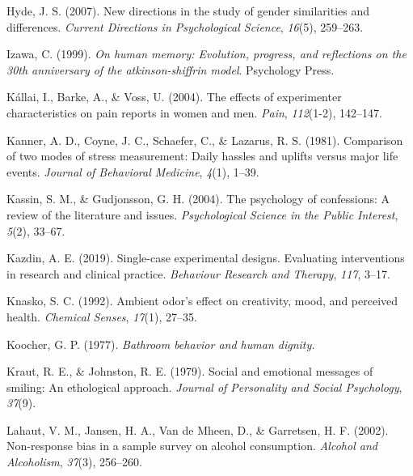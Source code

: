 \documentclass[
]{krantz}
\newlength{\cslhangindent}
\newlength{\cslentryspacingunit} %
\newenvironment{CSLReferences}[2] %
 {%
  \setlength{\parindent}{0pt}
  \ifodd #1
  \let\oldpar\par
  \def\par{\hangindent=\cslhangindent\oldpar}
  \fi
  \setlength{\parskip}{#2\cslentryspacingunit}
 }%
 {}
\begin{document}
\begin{CSLReferences}{1}{0}
\leavevmode{}%
Hyde, J. S. (2007). New directions in the study of gender similarities and differences. \emph{Current Directions in Psychological Science}, \emph{16}(5), 259--263.

\leavevmode{}%
Izawa, C. (1999). \emph{On human memory: Evolution, progress, and reflections on the 30th anniversary of the atkinson-shiffrin model}. Psychology Press.

\leavevmode{}%
Kállai, I., Barke, A., \& Voss, U. (2004). The effects of experimenter characteristics on pain reports in women and men. \emph{Pain}, \emph{112}(1-2), 142--147.

\leavevmode{}%
Kanner, A. D., Coyne, J. C., Schaefer, C., \& Lazarus, R. S. (1981). Comparison of two modes of stress measurement: Daily hassles and uplifts versus major life events. \emph{Journal of Behavioral Medicine}, \emph{4}(1), 1--39.

\leavevmode{}%
Kassin, S. M., \& Gudjonsson, G. H. (2004). The psychology of confessions: A review of the literature and issues. \emph{Psychological Science in the Public Interest}, \emph{5}(2), 33--67.

\leavevmode{}%
Kazdin, A. E. (2019). Single-case experimental designs. Evaluating interventions in research and clinical practice. \emph{Behaviour Research and Therapy}, \emph{117}, 3--17.

\leavevmode{}%
Knasko, S. C. (1992). Ambient odor's effect on creativity, mood, and perceived health. \emph{Chemical Senses}, \emph{17}(1), 27--35.

\leavevmode{}%
Koocher, G. P. (1977). \emph{Bathroom behavior and human dignity.}

\leavevmode{}%
Kraut, R. E., \& Johnston, R. E. (1979). Social and emotional messages of smiling: An ethological approach. \emph{Journal of Personality and Social Psychology}, \emph{37}(9).

\leavevmode{}%
Lahaut, V. M., Jansen, H. A., Van de Mheen, D., \& Garretsen, H. F. (2002). Non-response bias in a sample survey on alcohol consumption. \emph{Alcohol and Alcoholism}, \emph{37}(3), 256--260.


\end{CSLReferences}
\end{document}
